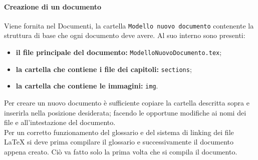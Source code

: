             \paragraph{Creazione di un documento}
            Viene fornita nel  Documenti, la cartella \texttt{Modello nuovo documento} contenente la struttura di base che ogni documento deve avere. Al suo interno sono presenti: 
            \begin{itemize}
            	\item \textbf{il file principale del documento:} \texttt{ModelloNuovoDocumento.tex};
            	\item \textbf{la cartella che contiene i file dei capitoli:} \texttt{sections};
            	\item \textbf{la cartella che contiene le immagini:} \texttt{img}.
            \end{itemize}  
	        Per creare un nuovo documento è sufficiente copiare la cartella descritta sopra e inserirla nella posizione desiderata; facendo le opportune modifiche ai nomi dei file e all'intestazione del documento. \\
            Per un corretto funzionamento del glossario e del sistema di linking dei file \LaTeX{} si deve prima compilare il glossario e successivamente il documento appena creato. Ciò va fatto solo la prima volta che si compila il documento.
